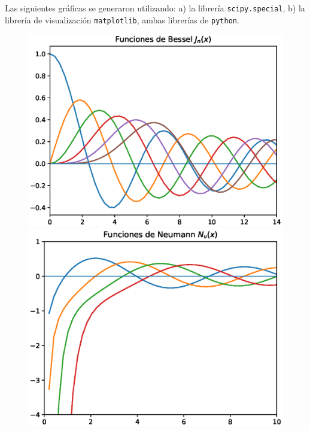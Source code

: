 {}
Las siguientes gráficas se generaron utilizando: a) la librería \texttt{scipy.special}, b) la librería de visualización \texttt{matplotlib}, ambas librerías de \texttt{python}.

\begin{figure}[H]
    \centering
    \begin{minipage}{0.4\linewidth}
        \includegraphics[scale=0.6]{Imagenes/plot_bessel.eps}
    \end{minipage}
    \hspace{1cm}
    \begin{minipage}{0.4\linewidth}
        \includegraphics[scale=0.6]{Imagenes/plot_neumann.eps}
    \end{minipage}
\end{figure}

